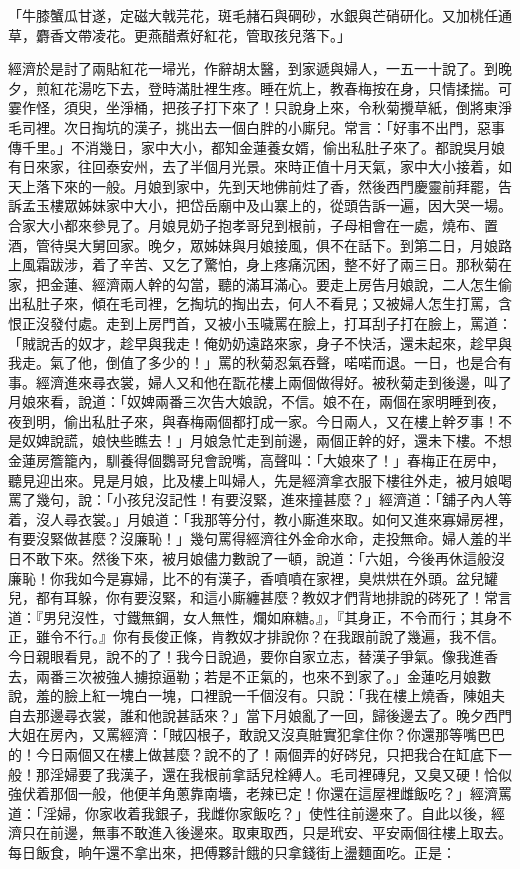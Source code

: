\begin{showcontents}{}
「牛膝蟹瓜甘遂，定磁大戟芫花，斑毛赭石與碙砂，水銀與芒硝研化。又加桃任通草，麝香文帶凌花。更燕醋煮好紅花，管取孩兒落下。」

經濟於是討了兩貼紅花一埽光，作辭胡太醫，到家遞與婦人，一五一十說了。到晚夕，煎紅花湯吃下去，登時滿肚裡生疼。睡在炕上，教春梅按在身，只情揉揣。可霎作怪，須臾，坐淨桶，把孩子打下來了！只說身上來，令秋菊攪草紙，倒將東淨毛司裡。次日掏坑的漢子，挑出去一個白胖的小廝兒。常言：「好事不出門，惡事傳千里。」不消幾日，家中大小，都知金蓮養女婿，偷出私肚子來了。都說吳月娘有日來家，往回泰安州，去了半個月光景。來時正值十月天氣，家中大小接着，如天上落下來的一般。月娘到家中，先到天地佛前炷了香，然後西門慶靈前拜罷，告訴孟玉樓眾姊妹家中大小，把岱岳廟中及山寨上的，從頭告訴一遍，因大哭一場。合家大小都來參見了。月娘見奶子抱孝哥兒到根前，子母相會在一處，燒布、置酒，管待吳大舅回家。晚夕，眾姊妹與月娘接風，俱不在話下。到第二日，月娘路上風霜跋涉，着了辛苦、又乞了驚怕，身上疼痛沉困，整不好了兩三日。那秋菊在家，把金蓮、經濟兩人幹的勾當，聽的滿耳滿心。要走上房告月娘說，二人怎生偷出私肚子來，傾在毛司裡，乞掏坑的掏出去，何人不看見；又被婦人怎生打罵，含恨正沒發付處。走到上房門首，又被小玉噦罵在臉上，打耳刮子打在臉上，罵道：「賊說舌的奴才，趁早與我走！俺奶奶遠路來家，身子不快活，還未起來，趁早與我走。氣了他，倒值了多少的！」罵的秋菊忍氣吞聲，喏喏而退。一日，也是合有事。經濟進來尋衣裳，婦人又和他在翫花樓上兩個做得好。被秋菊走到後邊，叫了月娘來看，說道：「奴婢兩番三次告大娘說，不信。娘不在，兩個在家明睡到夜，夜到明，偷出私肚子來，與春梅兩個都打成一家。今日兩人，又在樓上幹歹事！不是奴婢說謊，娘快些瞧去！」月娘急忙走到前邊，兩個正幹的好，還未下樓。不想金蓮房簷籠內，馴養得個鸚哥兒會說嘴，高聲叫：「大娘來了！」春梅正在房中，聽見迎出來。見是月娘，比及樓上叫婦人，先是經濟拿衣服下樓往外走，被月娘喝罵了幾句，說：「小孩兒沒記性！有要沒緊，進來撞甚麼？」經濟道：「舖子內人等着，沒人尋衣裳。」月娘道：「我那等分付，教小廝進來取。如何又進來寡婦房裡，有要沒緊做甚麼？沒廉恥！」幾句罵得經濟往外金命水命，走投無命。婦人羞的半日不敢下來。然後下來，被月娘儘力數說了一頓，說道：「六姐，今後再休這般沒廉恥！你我如今是寡婦，比不的有漢子，香噴噴在家裡，臭烘烘在外頭。盆兒罐兒，都有耳躲，你有要沒緊，和這小廝纏甚麼？教奴才們背地排說的硶死了！常言道：『男兒沒性，寸鐵無鋼，女人無性，爛如麻糖。』，『其身正，不令而行；其身不正，雖令不行。』你有長俊正條，肯教奴才排說你？在我跟前說了幾遍，我不信。今日親眼看見，說不的了！我今日說過，要你自家立志，替漢子爭氣。像我進香去，兩番三次被強人擄掠逼勒；若是不正氣的，也來不到家了。」金蓮吃月娘數說，羞的臉上紅一塊白一塊，口裡說一千個沒有。只說：「我在樓上燒香，陳姐夫自去那邊尋衣裳，誰和他說甚話來？」當下月娘亂了一回，歸後邊去了。晚夕西門大姐在房內，又罵經濟：「賊囚根子，敢說又沒真賍實犯拿住你？你還那等嘴巴巴的！今日兩個又在樓上做甚麼？說不的了！兩個弄的好硶兒，只把我合在缸底下一般！那淫婦要了我漢子，還在我根前拿話兒栓縛人。毛司裡磚兒，又臭又硬！恰似強伏着那個一般，他便羊角蔥靠南墻，老辣已定！你還在這屋裡雌飯吃？」經濟罵道：「淫婦，你家收着我銀子，我雌你家飯吃？」使性往前邊來了。自此以後，經濟只在前邊，無事不敢進入後邊來。取東取西，只是玳安、平安兩個往樓上取去。每日飯食，晌午還不拿出來，把傅夥計餓的只拿錢街上盪麵面吃。正是：


\end{showcontents}
